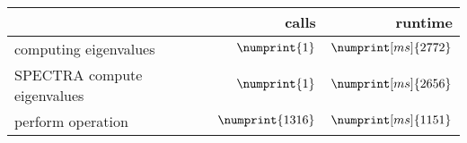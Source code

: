 \begin{tabular}{l|r|r}
	 & calls & runtime \\
\hline	\hspace{0mm}computing eigenvalues & $\numprint{1}$ & $\numprint[ms]{2772}$ \\
	\hspace{5mm}SPECTRA compute eigenvalues & $\numprint{1}$ & $\numprint[ms]{2656}$ \\
	\hspace{10mm}perform operation & $\numprint{1316}$ & $\numprint[ms]{1151}$
\end{tabular}
